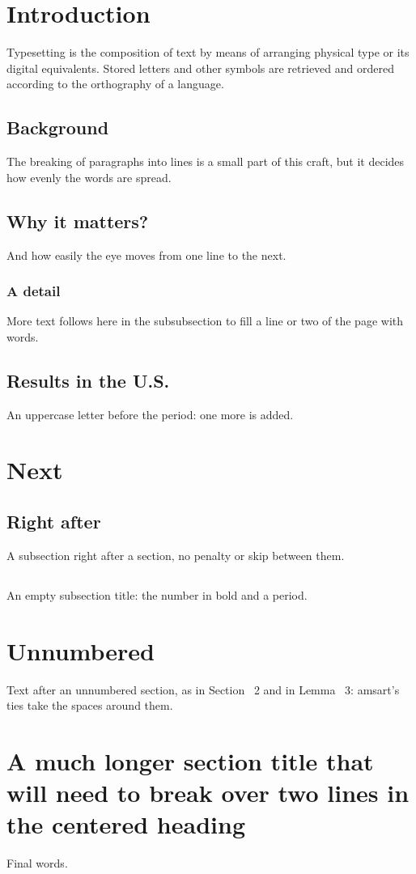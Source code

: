 \documentclass{amsart}
\begin{document}
\section{Introduction}
Typesetting is the composition of text by means of arranging physical type or its digital equivalents. Stored letters and other symbols are retrieved and ordered according to the orthography of a language.

\subsection{Background}
The breaking of paragraphs into lines is a small part of this craft, but it decides how evenly the words are spread.

\subsection{Why it matters?}
And how easily the eye moves from one line to the next.

\subsubsection{A detail}
More text follows here in the subsubsection to fill a line or two of the page with words.

\subsection{Results in the U.S.}
An uppercase letter before the period: one more is added.

\section{Next}
\subsection{Right after}
A subsection right after a section, no penalty or skip between them.

\subsection{}
An empty subsection title: the number in bold and a period.

\section*{Unnumbered}
Text after an unnumbered section, as in Section ~2 and in Lemma~ 3: amsart's ties take the spaces around them.
\section{A much longer section title that will need to break over two lines in the centered heading}
Final words.
\end{document}
